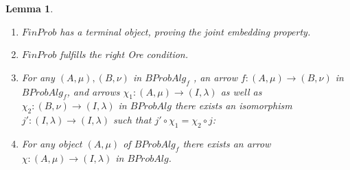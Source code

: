 \documentclass[a4paper,draft]{amsproc}
\theoremstyle{plain}
\newtheorem{lemma}{Lemma}[section]
\theoremstyle{definition}
\theoremstyle{remark}
\numberwithin{equation}{section}
\begin{document}
\begin{lemma}\begin{enumerate}
\item $FinProb$ has a terminal object, proving the joint embedding property.
\item $FinProb$ fulfills the right Ore condition.
\item For any $(A,\mu),(B,\nu)$ in $BProbAlg_f$ , an arrow $f:(A,\mu)\rightarrow (B,\nu)$ in \\
 $BProbAlg_f$, and arrows $\chi_1:(A,\mu)\rightarrow (I,\lambda)$ as well as $\chi_2:(B,\nu)\rightarrow (I,\lambda)$ in $BProbAlg$ there exists an isomorphism $j':(I,\lambda)\rightarrow (I,\lambda)$ such that $j'\circ \chi_1=\chi_2\circ j$:
 \begin{center}
 \end{center}
\item For any object $(A,\mu)$ of $BProbAlg_f$ there exists an arrow $\chi:(A,\mu)\rightarrow (I,\lambda)$ in $BProbAlg$.
\end{enumerate}
\end{lemma}
\end{document}
